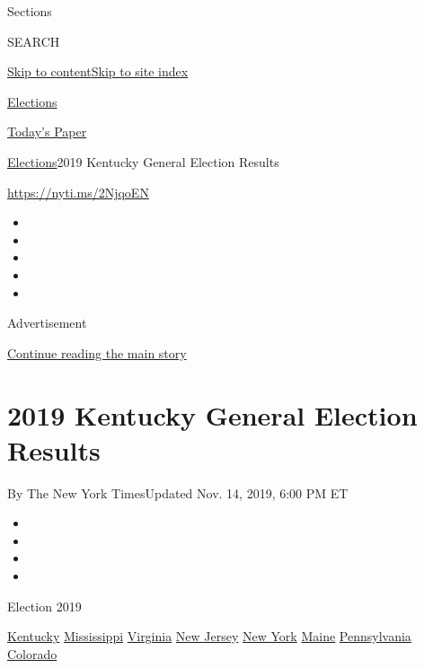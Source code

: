 Sections

SEARCH

\protect\hyperlink{site-content}{Skip to
content}\protect\hyperlink{site-index}{Skip to site index}

\href{https://www.nytimes3xbfgragh.onion/news-event/2020-election}{Elections}

\href{https://myaccount.nytimes3xbfgragh.onion/auth/login?response_type=cookie\&client_id=vi}{}

\href{https://www.nytimes3xbfgragh.onion/section/todayspaper}{Today's
Paper}

\href{/news-event/2020-election}{Elections}\textbar{}2019 Kentucky
General Election Results

\url{https://nyti.ms/2NjqoEN}

\begin{itemize}
\item
\item
\item
\item
\item
\end{itemize}

Advertisement

\protect\hyperlink{after-top}{Continue reading the main story}

\hypertarget{2019-kentucky-general-election-results}{%
\section{2019 Kentucky General Election
Results}\label{2019-kentucky-general-election-results}}

By The New York TimesUpdated Nov. 14, 2019, 6:00 PM ET

\begin{itemize}
\item
\item
\item
\item
\end{itemize}

Election 2019

\href{https://www.nytimes3xbfgragh.onion/interactive/2019/11/05/us/elections/results-kentucky-general-elections.html}{Kentucky}
\href{https://www.nytimes3xbfgragh.onion/interactive/2019/11/05/us/elections/results-mississippi-general-elections.html}{Mississippi}
\href{https://www.nytimes3xbfgragh.onion/interactive/2019/11/05/us/elections/results-virginia-general-elections.html}{Virginia}
\href{https://www.nytimes3xbfgragh.onion/interactive/2019/11/05/us/elections/results-new-jersey-general-elections.html}{New
Jersey}
\href{https://www.nytimes3xbfgragh.onion/interactive/2019/11/05/us/elections/results-new-york-general-elections.html}{New
York}
\href{https://www.nytimes3xbfgragh.onion/interactive/2019/11/05/us/elections/results-maine-general-elections.html}{Maine}
\href{https://www.nytimes3xbfgragh.onion/interactive/2019/11/05/us/elections/results-pennsylvania-general-elections.html}{Pennsylvania}
\href{https://www.nytimes3xbfgragh.onion/interactive/2019/11/05/us/elections/results-colorado-general-elections.html}{Colorado}

